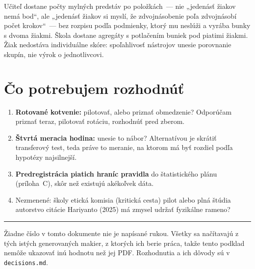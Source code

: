 \documentclass[9.5pt,a4paper]{article}
\begin{document}
Učiteľ dostane počty mylných predstáv po položkách~--- nie „jedenásť žiakov nemá
bod“, ale „jedenásť žiakov si myslí, že zdvojnásobenie poľa zdvojnásobí počet
krokov“~--- bez rozpisu podľa podmienky, ktorý mu neslúži a vyrába bunky s dvoma
žiakmi. Škola dostane agregáty s potlačením buniek pod piatimi žiakmi. Žiak
nedostáva individuálne skóre: spoľahlivosť nástrojov unesie porovnanie skupín,
nie výrok o jednotlivcovi.

\section{Čo potrebujem rozhodnúť}

\begin{enumerate}
    \item \textbf{Rotované kotvenie:} pilotovať, alebo priznať obmedzenie?
    Odporúčam priznať teraz, pilotovať rotáciu, rozhodnúť pred zberom.
    \item \textbf{Štvrtá meracia hodina:} unesie to nábor? Alternatívou je
    skrátiť transferový test, teda práve to meranie, na ktorom má byť rozdiel
    podľa hypotézy najsilnejší.
    \item \textbf{Predregistrácia piatich hraníc pravidla} do štatistického plánu
    (príloha~C), skôr než existujú akékoľvek dáta.
    \item Nezmenené: školy \textbullet{} etická komisia (kritická cesta)
    \textbullet{} pilot alebo plná štúdia \textbullet{} autorstvo citácie
    Hariyanto (2025) \textbullet{} má zmysel udržať fyzikálne rameno?
\end{enumerate}

\enlargethispage{3\baselineskip}
\vspace{2pt}\textcolor{rule}{\hrule}\vspace{3pt}
{\footnotesize\color{warn} Žiadne číslo v tomto dokumente nie je napísané rukou.
Všetky sa načítavajú z tých istých generovaných makier, z ktorých ich berie
práca, takže tento podklad nemôže ukazovať inú hodnotu než jej PDF.
Rozhodnutia a ich dôvody sú v \texttt{decisions.md}.}
\end{document}
